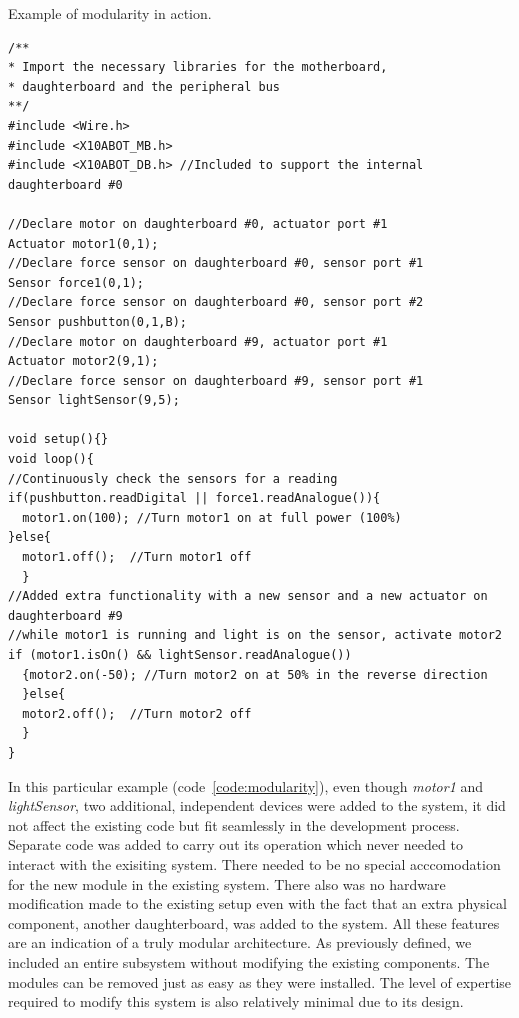 \begin{listing}[H]
		\footnotesize
		\caption{Example of modularity in action.} \label{code:modularity}
		\begin{verbatim}
/**
* Import the necessary libraries for the motherboard, 
* daughterboard and the peripheral bus
**/
#include <Wire.h>  
#include <X10ABOT_MB.h>
#include <X10ABOT_DB.h> //Included to support the internal daughterboard #0

//Declare motor on daughterboard #0, actuator port #1
Actuator motor1(0,1);
//Declare force sensor on daughterboard #0, sensor port #1
Sensor force1(0,1);
//Declare force sensor on daughterboard #0, sensor port #2
Sensor pushbutton(0,1,B);
//Declare motor on daughterboard #9, actuator port #1
Actuator motor2(9,1);
//Declare force sensor on daughterboard #9, sensor port #1
Sensor lightSensor(9,5);

void setup(){}
void loop(){
//Continuously check the sensors for a reading
if(pushbutton.readDigital || force1.readAnalogue()){
  motor1.on(100); //Turn motor1 on at full power (100%) 
}else{
  motor1.off();  //Turn motor1 off
  }
//Added extra functionality with a new sensor and a new actuator on daughterboard #9
//while motor1 is running and light is on the sensor, activate motor2
if (motor1.isOn() && lightSensor.readAnalogue())
  {motor2.on(-50); //Turn motor2 on at 50% in the reverse direction
  }else{
  motor2.off();  //Turn motor2 off
  }
}	 
	\end{verbatim}
		
\end{listing}
In this particular example (code~\ref{code:modularity}), even though \emph{motor1} and \emph{lightSensor}, two additional, independent devices were added to the system, it did not affect the existing code but fit seamlessly in the development process. Separate code was added to carry out its operation which never needed to interact with the exisiting system. There needed to be no special acccomodation for the new module in the existing system. There also was no hardware modification made to the existing setup even with the fact that an extra physical component, another daughterboard, was added to the system.
All these features are an indication of a truly modular architecture. As previously defined, we included an entire subsystem without modifying the existing components. The modules can be removed just as easy as they were installed. The level of expertise required to modify this system is also relatively minimal due to its design.


